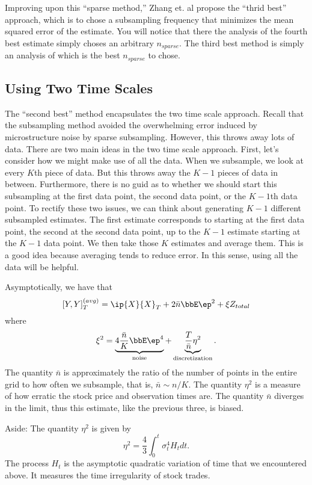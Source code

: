 \documentclass{report}
\begin{document}
Improving upon this ``sparse method,'' Zhang et. al propose the
``thrid best'' approach, which is to chose a subsampling frequency
that minimizes the mean squared error of the estimate.  You will
notice that there the analysis of the fourth best estimate simply
choses an arbitrary $n_{sparse}$.  The third best method is simply an
analysis of which is the best $n_{sparse}$ to chose.

\subsection*{Using Two Time Scales}

The ``second best'' method encapsulates the two time scale approach. 
Recall that the subsampling method avoided the overwhelming error
induced by microstructure noise by sparse subsampling.  However, this
throws away lots of data.  There are two main ideas in the two time
scale approach.  First, let's consider how we might make use of all
the data.  When we subsample, we look at every $K$th piece of data. 
But this throws away the $K-1$ pieces of data in between. 
Furthermore, there is no guid as to whether we should start this
subsampling at the first data point, the second data point, or the
$K-1$th data point.  To rectify these two issues, we can think about
generating $K-1$ different subsampled estimates.  The first estimate
corresponds to starting at the first data point, the second at the
second data point, up to the $K-1$ estimate starting at the $K-1$ data
point.  We then take those $K$ estimates and average them.  This is a
good idea because averaging tends to reduce error.  In this sense,
using all the data will be helpful.

Asymptotically, we have that
\[
[Y,Y]_T^{(avg)} = \ip{X}{X}_T + 2 \bar n \bbE \ep^2 + \xi Z_{total}
\]
where
\[
\xi^2 = \underbrace{4 \frac{\bar n}{K} \bbE \ep^4}_{\textmd{noise}} +
\underbrace{\frac{T}{\bar n} \eta^2}_{\textmd{discretization}}.
\]
The quantity $\bar n$ is approximately the ratio of the number of
points in the entire grid to how often we subsample, that is, $\bar n
\sim n / K$.  The quantity $\eta^2$ is a measure of how erratic the
stock price and observation times are.  The quantity $\bar n$ diverges
in the limit, thus this estimate, like the previous three, is biased.

Aside: The quantity $\eta^2$ is given by
\[
\eta^2 = \frac{4}{3} \int_0^t \sigma_t^4 H_t dt.
\]
The process $H_t$ is the asymptotic quadratic variation of time that
we encountered above.  It measures the time irregularity of stock
trades.
\end{document}
